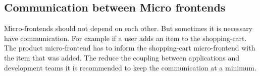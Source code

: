 \subsection{Communication between Micro frontends}

Micro-frontends should not depend on each other. But sometimes it is necessary have communication. For example if a user adds an item to the shopping-cart. The product micro-frontend has to inform the shopping-cart micro-frontend with the item that was added. The reduce the coupling between applications and development teams it is recommended to keep the communication at a minimum.